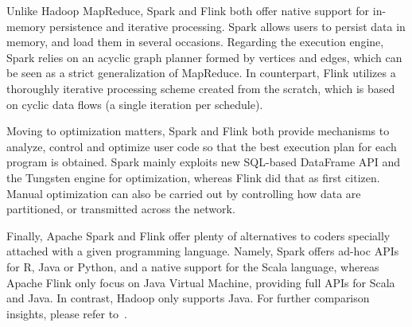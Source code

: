 \documentclass[3p,review]{elsarticle}
\begin{document}
	Unlike Hadoop MapReduce, Spark and Flink both offer native support for in-memory persistence and iterative processing. Spark allows users to persist data in memory, and load them in several occasions. Regarding the execution engine, Spark relies on an acyclic graph planner formed by vertices and edges, which can be seen as a strict generalization of MapReduce. In counterpart, Flink utilizes a thoroughly iterative processing scheme created from the scratch, which is based on cyclic data flows (a single iteration per schedule). %
	
	
	Moving to optimization matters, Spark and Flink both provide mechanisms to analyze, control and optimize user code so that the best execution plan for each program is obtained. Spark mainly exploits new SQL-based DataFrame API and the Tungsten engine for optimization, whereas Flink did that as first citizen. Manual optimization can also be carried out by controlling how data are partitioned, or transmitted across the network. %
	
	Finally, Apache Spark and Flink offer plenty of alternatives to coders specially attached with a given programming language. Namely, Spark offers ad-hoc APIs for R, Java or Python, and a native support for the Scala language, whereas Apache Flink only focus on Java Virtual Machine, providing full APIs for Scala and Java. In contrast, Hadoop only supports Java. For further comparison insights, please refer to~\cite{Garcia-Gil2017}.%
	
\end{document}
